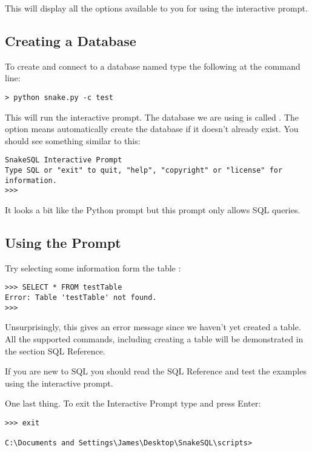 \documentclass{howto}
\begin{document}
This will display all the options available to you for using the interactive prompt. 


\subsection{Creating a Database}

To create and connect to a database named  type the following at the command line:

\begin{verbatim}
> python snake.py -c test
\end{verbatim}

This will run the interactive prompt. The database we are using is called . The  option means automatically create the database if it doesn't already exist. You should see something similar to this:

\begin{verbatim}
SnakeSQL Interactive Prompt
Type SQL or "exit" to quit, "help", "copyright" or "license" for information.
>>>
\end{verbatim}

It looks a bit like the Python prompt but this prompt only allows SQL queries.

\subsection{Using the Prompt}

Try selecting some information form the table :

\begin{verbatim}
>>> SELECT * FROM testTable
Error: Table 'testTable' not found.
>>>
\end{verbatim}

Unsurprisingly, this gives an error message since we haven't yet created a table. All the supported commands, including creating a table will be demonstrated in the section SQL Reference.

If you are new to SQL you should read the SQL Reference and test the examples using the interactive prompt.

One last thing. To exit the Interactive Prompt type  and press Enter:
\begin{verbatim}
>>> exit

C:\Documents and Settings\James\Desktop\SnakeSQL\scripts>
\end{verbatim}
\end{document}
